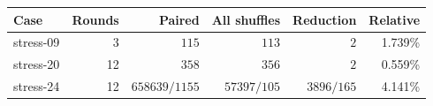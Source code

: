 \begin{tabular}{lrrrrr}
\toprule
Case & Rounds & Paired & All shuffles & Reduction & Relative\\\midrule
stress-09 & 3 & $115$ & $113$ & $2$ & 1.739\%\\
stress-20 & 12 & $358$ & $356$ & $2$ & 0.559\%\\
stress-24 & 12 & $658639/1155$ & $57397/105$ & $3896/165$ & 4.141\%\\
\bottomrule
\end{tabular}
